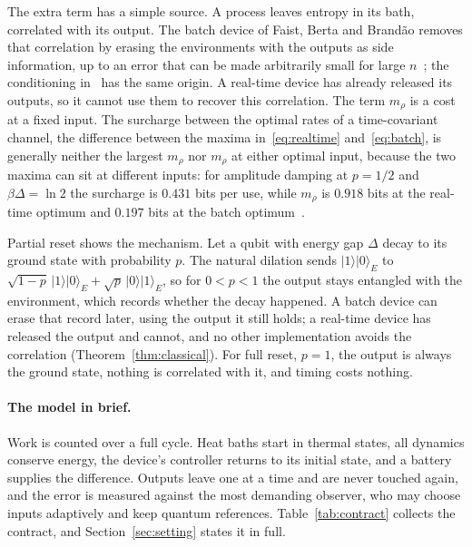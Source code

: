 \documentclass[11pt]{article}
\theoremstyle{definition}
\theoremstyle{remark}
\begin{document}
The extra term has a simple source. A process leaves entropy in its bath, correlated with its output. The batch device of Faist, Berta and Brand\~ao removes that correlation by erasing the environments with the outputs as side information, up to an error that can be made arbitrarily small for large $n$~\cite[Thm.~7.1]{FBB21}; the conditioning in~\cite{FDOR15} has the same origin. A real-time device has already released its outputs, so it cannot use them to recover this correlation. The term $m_\rho$ is a cost at a fixed input. The surcharge between the optimal rates of a time-covariant channel, the difference between the maxima in~\eqref{eq:realtime} and~\eqref{eq:batch}, is generally neither the largest $m_\rho$ nor $m_\rho$ at either optimal input, because the two maxima can sit at different inputs: for amplitude damping at $p=1/2$ and $\beta\Delta=\ln2$ the surcharge is $0.431$ bits per use, while $m_\rho$ is $0.918$ bits at the real-time optimum and $0.197$ bits at the batch optimum~\cite{TimeOrder}.

Partial reset shows the mechanism. Let a qubit with energy gap $\Delta$ decay to its ground state with probability $p$. The natural dilation sends $|1\rangle|0\rangle_E$ to $\sqrt{1-p}\,|1\rangle|0\rangle_E+\sqrt p\,|0\rangle|1\rangle_E$, so for $0<p<1$ the output stays entangled with the environment, which records whether the decay happened. A batch device can erase that record later, using the output it still holds; a real-time device has released the output and cannot, and no other implementation avoids the correlation (Theorem~\ref{thm:classical}). For full reset, $p=1$, the output is always the ground state, nothing is correlated with it, and timing costs nothing.

\paragraph{The model in brief.} Work is counted over a full cycle. Heat baths start in thermal states, all dynamics conserve energy, the device's controller returns to its initial state, and a battery supplies the difference. Outputs leave one at a time and are never touched again, and the error is measured against the most demanding observer, who may choose inputs adaptively and keep quantum references. Table~\ref{tab:contract} collects the contract, and Section~\ref{sec:setting} states it in full.
\end{document}
